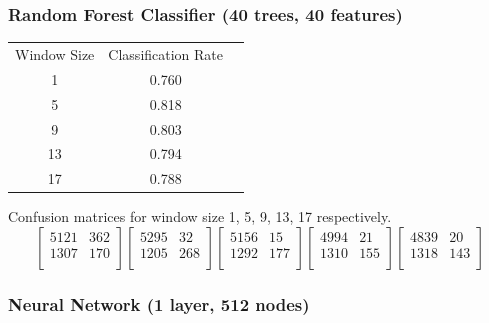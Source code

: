 \documentclass[12pt,a4paper]{article}
\begin{document}
\subsubsection{Random Forest Classifier (40 trees, 40 features)}
\begin{center}
\begin{tabular}{ c c c }
Window Size & Classification Rate \\
 1 & 0.760 \\
 5 & 0.818 \\
 9 & 0.803\\
 13 &  0.794\\
 17 & 0.788 
\end{tabular}
\end{center}
Confusion matrices for window size 1, 5, 9, 13, 17 respectively.  
\[
  \begin{bmatrix}
  5121 & 362 \\
  1307 & 170\\
  \end{bmatrix} 
  \begin{bmatrix}
5295  & 32 \\
1205 & 268 \\
   \end{bmatrix}
  \begin{bmatrix}
5156  & 15\\
1292 & 177\\
   \end{bmatrix}
  \begin{bmatrix}
4994  & 21\\
1310 & 155\\
   \end{bmatrix}
  \begin{bmatrix}
4839  & 20\\
1318 & 143\\
   \end{bmatrix}
\]

\subsubsection{Neural Network (1 layer, 512 nodes) }
\end{document}
